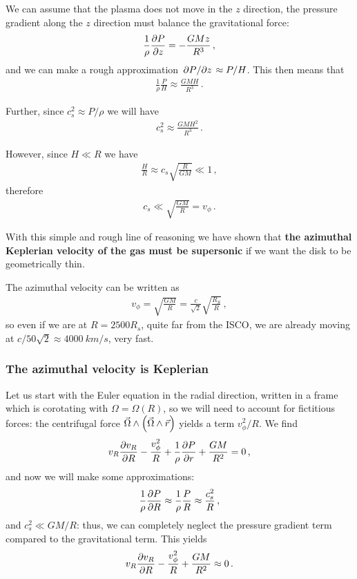 \documentclass[main.tex]{subfiles}
\begin{document}
We can assume that the plasma does not move in the \(z\) direction, the pressure gradient along the \(z\) direction must balance the gravitational force: 
%
\begin{align}
\frac{1}{\rho } \pdv{P}{z} = - \frac{GMz}{R^3} 
\,,
\end{align}
%
and we can make a rough approximation \(\pdv*{P}{z} \approx P / H\). This then means that 
%
\begin{align}
\frac{1}{\rho } \frac{P}{H} \approx \frac{GMH}{R^3}
\,.
\end{align}

Further, since \(c_s^2 \approx P / \rho \) we will have 
%
\begin{align} \label{eq:speed-of-sound-disk-shape}
c_s^2 \approx \frac{GM H^2}{R^3}
\,.
\end{align}

However, since \(H \ll R\) we have 
%
\begin{align}
\frac{H}{R} \approx c_s \sqrt{ \frac{R}{GM}} \ll 1
\,,
\end{align}
%
therefore 
%
\begin{align}
c_s \ll \sqrt{ \frac{GM}{R}} = v_\phi 
\,.
\end{align}

With this simple and rough line of reasoning we have shown that \textbf{the azimuthal Keplerian velocity of the gas must be supersonic} if we want the disk to be geometrically thin.

The azimuthal velocity can be written as 
%
\begin{align}
v_\phi = \sqrt{ \frac{GM}{R}} = \frac{c}{\sqrt{2}} \sqrt{ \frac{R_S}{R}}
\,,
\end{align}
%
so even if we are at \(R = 2500 R_s\), quite far from the ISCO, we are already moving at \(c/ 50 \sqrt{2} \approx \SI{4000}{km/s}\), very fast. 

\subsubsection{The azimuthal velocity is Keplerian}

Let us start with the Euler equation in the radial direction, written in a frame which is corotating with \(\Omega = \Omega (R)\), so we will need to account for fictitious forces: the centrifugal force \(\vec{\Omega} \wedge \qty(\vec{\Omega} \wedge \vec{r})\) yields a term \(v_\phi^2 / R\).
We find 
%
\begin{align}
v_R \pdv{v_R}{R} - \frac{v_\phi^2}{R} + \frac{1}{\rho } \pdv{P}{r} + \frac{GM}{R^2} = 0
\,,
\end{align}
%
and now we will make some approximations: 
%
\begin{align}
\frac{1}{\rho } \pdv{P}{R} \approx \frac{1}{\rho } \frac{P}{R} \approx \frac{c_s^2}{R}
\,,
\end{align}
%
and \(c_s^2 \ll GM/R \): thus, we can completely neglect the pressure gradient term compared to the gravitational term. 
This yields 
%
\begin{align}
v_R \pdv{v_R}{R} - \frac{v_\phi^2}{R} + \frac{GM}{R^2} \approx 0
\,.
\end{align}
\end{document}
